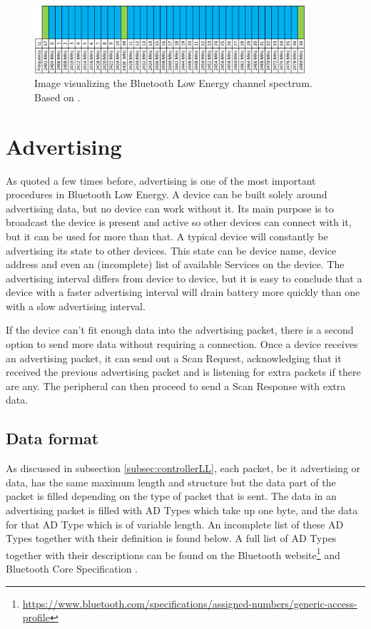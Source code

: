 \documentclass[pdftex,a4paper,12pt,twoside]{report}
\begin{document}
\begin{figure}[h]
    \centering
    \includegraphics[width=0.9\textwidth]{img/channelmap.png}
    \caption[Image visualizing the Bluetooth Low Energy channel spectrum]{Image visualizing the Bluetooth Low Energy channel spectrum. Based on \cite{Townsend2014}.}
    \label{fig:channelmap}
\end{figure}

\section{Advertising}
\label{sec:advertising}
As quoted a few times before, advertising is one of the most important procedures in Bluetooth Low Energy. A device can be built solely around advertising data, but no device can work without it. Its main purpose is to broadcast the device is present and active so other devices can connect with it, but it can be used for more than that. A typical device will constantly be advertising its state to other devices. This state can be device name, device address and even an (incomplete) list of available Services on the device. The advertising interval differs from device to device, but it is easy to conclude that a device with a faster advertising interval will drain battery more quickly than one with a slow advertising interval.

If the device can't fit enough data into the advertising packet, there is a second option to send more data without requiring a connection. Once a device receives an advertising packet, it can send out a Scan Request, acknowledging that it received the previous advertising packet and is listening for extra packets if there are any. The peripheral can then proceed to send a Scan Response with extra data.

\subsection{Data format}
\label{subsec:advdataformat}
As discussed in subsection \ref{subsec:controllerLL}, each packet, be it advertising or data, has the same maximum length and structure but the data part of the packet is filled depending on the type of packet that is sent. The data in an advertising packet is filled with AD Types which take up one byte, and the data for that AD Type which is of variable length. An incomplete list of these AD Types together with their definition is found below. A full list of AD Types together with their descriptions can be found on the Bluetooth website\footnote{\url{https://www.bluetooth.com/specifications/assigned-numbers/generic-access-profile}} and Bluetooth Core Specification \citep{bluetooth2014bluetooth}.
\end{document}
